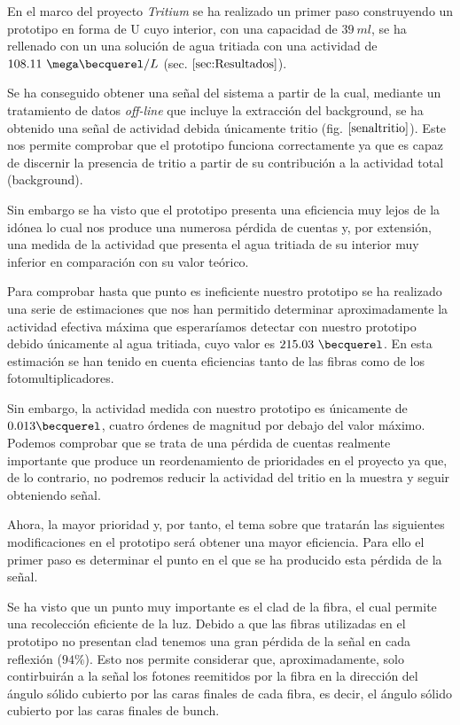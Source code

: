 En el marco del proyecto \textit{Tritium} se ha realizado un primer paso construyendo un prototipo en forma de U cuyo interior, con una capacidad de $39~ml$, se ha rellenado con un una solución de agua tritiada con una actividad de $108.11~\mega\becquerel/L$ (sec. $\ref{sec:Resultados}$).

Se ha conseguido obtener una señal del sistema a partir de la cual, mediante un tratamiento de datos \textit{off-line} que incluye la extracción del background, se ha obtenido una señal de actividad debida únicamente tritio (fig. $\ref{senaltritio}$). Este nos permite comprobar que el prototipo funciona correctamente ya que es capaz de discernir la presencia de tritio a partir de su contribución a la actividad total (background).

Sin embargo se ha visto que el prototipo presenta una eficiencia muy lejos de la idónea lo cual nos produce una numerosa pérdida de cuentas y, por extensión, una medida de la actividad que presenta el agua tritiada de su interior muy inferior en comparación con su valor teórico. 

Para comprobar hasta que punto es ineficiente nuestro prototipo se ha realizado una serie de estimaciones que nos han permitido determinar aproximadamente la actividad efectiva máxima que esperaríamos detectar con nuestro prototipo debido únicamente al agua tritiada, cuyo valor es $215.03~\becquerel$. En esta estimación se han tenido en cuenta eficiencias tanto de las fibras como de los fotomultiplicadores. 

Sin embargo, la actividad medida con nuestro prototipo es únicamente de $0.013\becquerel$, cuatro órdenes de magnitud por debajo del valor máximo. Podemos comprobar que se trata de una pérdida de cuentas realmente importante que produce un reordenamiento de prioridades en el proyecto ya que, de lo contrario, no podremos reducir la actividad del tritio en la muestra y seguir obteniendo señal. 

Ahora, la mayor prioridad y, por tanto, el tema sobre que tratarán las siguientes modificaciones en el prototipo será obtener una mayor eficiencia. Para ello el primer paso es determinar el punto en el que se ha producido esta pérdida de la señal. 

Se ha visto que un punto muy importante es el clad de la fibra, el cual permite una recolección eficiente de la luz. Debido a que las fibras utilizadas en el prototipo no presentan clad tenemos una gran pérdida de la señal en cada reflexión ($94\%$). Esto nos permite considerar que, aproximadamente, solo contirbuirán a la señal los fotones reemitidos por la fibra en la dirección del ángulo sólido cubierto por las caras finales de cada fibra, es decir, el ángulo sólido cubierto por las caras finales de bunch. 

